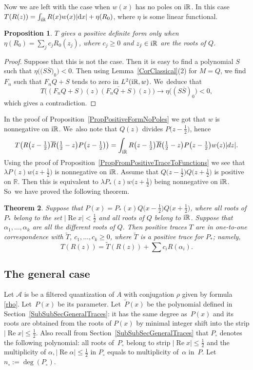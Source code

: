 \documentclass[pdftex]{sigma}
\newcommand{\RN}{\mathbb{R}} %
\newcommand{\ovl}{\overline}
\newcommand{\mc}[1]{\mathcal{#1}}
\renewcommand{\Re}{\operatorname{Re}}
\newtheorem{Theorem}{Theorem}[section]
\newtheorem{Proposition}[Theorem]{Proposition}
\theoremstyle{definition}
\numberwithin{equation}{section}
\begin{document}
Now we are left with the case when $w(x)$ has no poles on ${\rm i}\RN$. In this case $T(R(z))=\int_{{\rm i}\RN}R(x)w(x)|{\rm d}x|+\eta(R_0)$, where $\eta$ is some linear functional.
\begin{Proposition}
\label{PropIfPositiveThenNoDerivatives}
$T$ gives a positive definite form only when $\eta(R_0)=\sum_{j}c_j R_0(z_j)$, where $c_j\geq 0$ and $z_j\in {\rm i}\mathbb R$ are the roots of $Q$.
\end{Proposition}
\begin{proof}
Suppose that this is not the case. Then it is easy to find a polynomial $S$ such that $\eta\big(\big(S\ovl{S}\big)_0\big)<0$. Then using Lemma~\ref{CorClassical}(2) for $M=Q$, we find $F_n$ such that $F_nQ+S$ tends to zero in $L^2({\rm i}\RN,w)$. We~deduce that
\[
T\big((F_nQ+S)(z)\ovl{(F_nQ+S)}(z)\big)\to \eta\big((S\ovl{S})_0\big)<0,
\]
which gives a contradiction.
\end{proof}

In the proof of Proposition~\ref{PropPositiveFormNoPoles} we got that $w$ is nonnegative on ${\rm i}\RN$. We~also note that $Q(z)$ divides $P\big(z-\tfrac12\big)$, hence
\[
T\big(R\big(z-\tfrac12\big)\ovl{R}\big(\tfrac12-z\big)P\big(z-\tfrac12\big)\big)
=\int_{{\rm i}\RN}R\big(z-\tfrac12\big)\ovl{R}\big(\tfrac12-z\big)P\big(z-\tfrac12\big) w(z) |dz|.
\]
Using the proof of Proposition~\ref{PropFromPositiveTraceToFunctions} we see that $\lambda P(z)w\big(z+\tfrac12\big)$ is nonnegative on ${\rm i}\RN$. Assume that $Q\big(z-\tfrac12\big)Q\big(z+\tfrac12\big)$ is positive on $\RN$. Then this is equivalent to $\lambda P_*(z)w\big(z+\tfrac12\big)$ being nonnegative on ${\rm i}\RN$. So~we have proved the following theorem.

\begin{Theorem}
\label{ThrPositiveDefiniteFormsClosedStrip}
Suppose that $P(x)=P_*(x)Q\big(x-\tfrac{1}{2}\big)Q\big(x+\frac{1}{2}\big)$, where all roots of $P_*$ belong to the set $|\Re x|<\frac{1}{2}$ and all roots of $Q$ belong to ${\rm i}\RN$. Suppose that $\alpha_1,\ldots,\alpha_k$ are all the different roots of $Q$. Then positive traces $T$ are in one-to-one correspondence with $\widetilde{T}$, $c_1,\ldots, c_k\geq 0$, where $\widetilde{T}$ is a positive trace for $P_*$; namely, \[T(R(z))=\widetilde{T}(R(z))+\sum c_i R(\alpha_i).\]
\end{Theorem}

\subsection{The general case}
Let $\mc{A}$ is be a filtered quantization of $A$ with conjugation $\rho$ given by
formula \eqref{rho}. Let~$P(x)$ be its parameter. Let~$\widetilde{P}(x)$ be the polynomial defined in Section~\ref{SubSubSecGeneralTraces}: it has the same degree as~$P(x)$ and its roots are obtained from the roots of $P(x)$ by minimal integer shift into the strip $|\Re x|\leq \frac{1}{2}$.
Also recall from Section~\ref{SubSubSecGeneralTraces}
that $P_\circ$ denotes the following polynomial:
all roots of~$P_\circ$ belong to strip $|\Re x|\leq \frac{1}{2}$ and the multiplicity of $\alpha, |\Re\alpha|\leq \frac{1}{2}$ in $P_\circ$ equals to multiplicity of~$\alpha$ in~$P$. Let~$n_\circ:=\deg(P_\circ)$.
\end{document}
